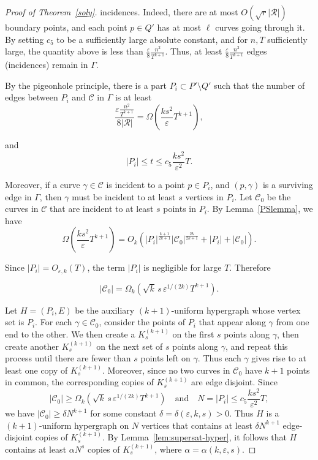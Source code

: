 \documentclass[10pt,a4paper]{amsart}
\begin{document}
\begin{proof}[Proof of Theorem~\ref{soly}]
\noindent incidences.  Indeed, there are at most $O(\sqrt{r}|\mathcal R|)$ boundary points, and each point $p \in Q'$ has at most $\ell$ curves going through it.   By setting $c_5$ to be a sufficiently large absolute constant, and for $n,T$ sufficiently large, the quantity above is less than $\frac{\varepsilon}{8} \frac{n^2}{T^{k+1}}$. Thus, at least $\frac{\varepsilon}{8} \frac{n^2}{T^{k+1}}$ edges (incidences) remain in $\Gamma$. 

By the pigeonhole principle, there is a part $P_i \subset P'\setminus Q'$ such that the number of edges between $P_i$ and $\mathcal C$ in $\Gamma$ is at least
\[
\frac{\varepsilon \frac{n^2}{T^{k+1}}}{8|\mathcal R|}
=
\Omega\!\left(
\frac{ks^2}{\varepsilon}
T^{k+1}
\right),
\]

\noindent and
\[
 |P_i|  \leq t \leq  c_5\frac{ks^2}{\varepsilon^2}T.
\]

Moreover, if a curve $\gamma \in \mathcal C$ is incident to a point $p \in P_i$, and $(p,\gamma)$ is a surviving edge in $\Gamma$, then $\gamma$ must be incident to at least $s$ vertices in $P_i$.  Let $\mathcal C_0$ be the curves in $\mathcal C$ that are incident to at least $s$ points in $P_i$. By Lemma~\ref{PSlemma}, we have
\[
\Omega\!\left(
\frac{ks^2}{\varepsilon}
T^{k+1}
\right)  = O_k\left(
|P_i|^{\frac{k + 1}{2k + 1}}
|\mathcal C_0|^{\frac{2k}{2k + 1}}
+|P_i|+|\mathcal  C_0|
\right).
\]

\noindent Since $|P_i|=O_{\varepsilon,k}\!\left(T\right)$, the term $|P_i|$ is negligible for large $T$. Therefore 


\[
|\mathcal C_0|
=
\Omega_k\!\left(
 \sqrt{k}\,s\,\varepsilon^{1/(2k)} 
T^{k+1}
\right).
\]

Let $H=(P_i,E)$ be the auxiliary $(k + 1)$-uniform hypergraph whose vertex set is $P_i$. For each $\gamma \in \mathcal C_0$, consider the points of $P_i$ that appear along $\gamma$ from one end to the other. We then create a $K^{(k+1)}_s$ on the first $s$ points along $\gamma$, then create another $K^{(k+1)}_s$ on the next set of $s$ points along $\gamma$, and repeat this process until there are fewer than $s$ points left on $\gamma$. Thus each $\gamma$ gives rise to at least one copy of $K^{(k+1)}_s$.  Moreover, since no two curves in $\mathcal C_0$ have $k + 1$ points in common, the corresponding copies of $K_s^{(k + 1)}$ are edge disjoint. Since
\[
|\mathcal C_0| \geq \Omega_k\!\left(
 \sqrt{k}\,s\,\varepsilon^{1/(2k)} 
T^{k+1}
\right)
\quad\text{and}\quad
N = |P_i|  \leq c_5\frac{ks^2}{\varepsilon^2}T,
\]
we have $|\mathcal C_0| \geq \delta N^{k + 1}$ for some constant $\delta = \delta(\varepsilon,k,s) > 0$. Thus $H$ is a $(k +1)$-uniform hypergraph on $N$ vertices that contains at least $\delta N^{k + 1}$ edge-disjoint copies of $K^{(k+1)}_s$. By Lemma~\ref{lem:supersat-hyper}, it follows that $H$ contains at least $\alpha N^s$ copies of $K^{(k+1)}_s$, where $\alpha=\alpha(k,\varepsilon,s)$.


\end{proof}
\end{document}
